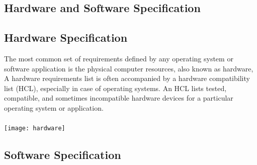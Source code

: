 \documentclass[a4paper, 12pt]{report}
\begin{document}
\subsection{Hardware and Software Speciﬁcation
}\subsection{Hardware Specification}
The most common set of requirements defined by any operating system or software application is the physical computer resources, also known as hardware, A hardware requirements list
is often accompanied by a hardware compatibility list (HCL), especially in case of operating
systems. An HCL lists tested, compatible, and sometimes incompatible hardware devices for a
particular operating system or application.\paragraph{}

\texttt{[image: hardware]}


\subsection{Software Specification}
\end{document}
